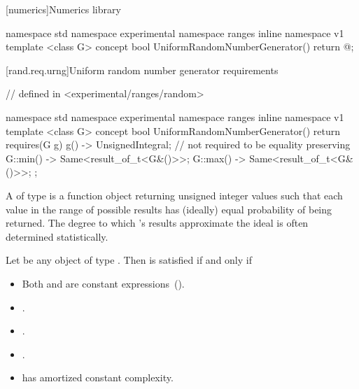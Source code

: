 [numerics]{Numerics library}


\begin{codeblock}
namespace std { namespace experimental { namespace ranges { inline namespace v1 {
  template <class G>
  concept bool UniformRandomNumberGenerator() { return @\seebelow@; }
}}}}
\end{codeblock}


[rand.req.urng]{Uniform random number generator requirements}%
%

\begin{codeblock}
// defined in <experimental/ranges/random>

namespace std { namespace experimental { namespace ranges { inline namespace v1 {
  template <class G>
  concept bool UniformRandomNumberGenerator() {
    return requires(G g) {
      { g() } -> UnsignedIntegral; // not required to be equality preserving
      { G::min() } -> Same<result_of_t<G&()>>;
      { G::max() } -> Same<result_of_t<G&()>>;
    };
  }
}}}}
\end{codeblock}

\pnum
A 
 of type 
is a function object
returning unsigned integer values
such that each value
in the range of possible results
has (ideally) equal probability
of being returned.
\enternote
 The degree to which 's results
 approximate the ideal
 is often determined statistically.
\exitnote

\pnum
Let  be any object of type . Then
 is satisfied if and only if

\begin{itemize}
\item Both  and  are constant expressions~().
\item {}.
\item {}.
\item {}.
\item {} has amortized constant complexity.
\end{itemize}
